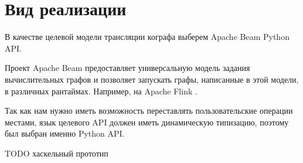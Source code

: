 \section{Вид реализации}

В качестве целевой модели трансляции кографа выберем Apache Beam Python API.

Проект Apache Beam предоставляет универсальную модель задания вычислительных графов и позволяет запускать графы, написанные в этой модели, в различных рантаймах. Например, на Apache Flink \cite{beam}.

Так как нам нужно иметь возможность переставлять пользовательские операции местами, язык целевого API должен иметь динамическую типизацию, поэтому был выбран именно Python API.






TODO хаскельный прототип
